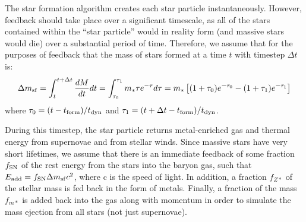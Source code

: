 

The star formation algorithm creates each star particle
instantaneously.  However, feedback should take place over a
significant timescale, as all of the stars contained within the ``star
particle'' would in reality form (and massive stars would die) over a
substantial period of time.  Therefore, we assume that for the
purposes of feedback that the mass of stars formed at a time $t$ with
timestep $\Delta t$ is:
\begin{equation}
\Delta m_{\rm sf} = \int_t^{t+\Delta t} \frac{dM}{dt} dt =
 \int_{\tau_0}^{\tau_1} m_* \tau e^{-\tau} d\tau =
 m_* \left[(1+\tau_0) e^{-\tau_0} - (1 + \tau_1) e^{-\tau_1} \right]
 \end{equation}
where $\tau_0 = (t-t_{\rm form})/t_{\rm dyn}$ and $\tau_1 = (t+\Delta t-t_{\rm form})/t_{\rm dyn}$.

%

During this timestep, the star particle returns
metal-enriched gas and thermal energy from supernovae and from stellar
winds.  Since massive stars have very short lifetimes, we assume that
there is an immediate feedback of some fraction $f_{\rm SN}$ of the rest
energy from the stars into the baryon gas, such
that $E_{\rm add} = f_{\rm SN} \Delta m_{\rm sf} c^2$, where c is the speed of
light.  In addition, a fraction $f_{Z*}$ of the stellar mass is fed back 
in the form of metals.  Finally, a fraction of the mass $f_{m*}$
is added back into the gas
along with momentum in order to simulate the mass ejection from
all stars (not just supernovae).

